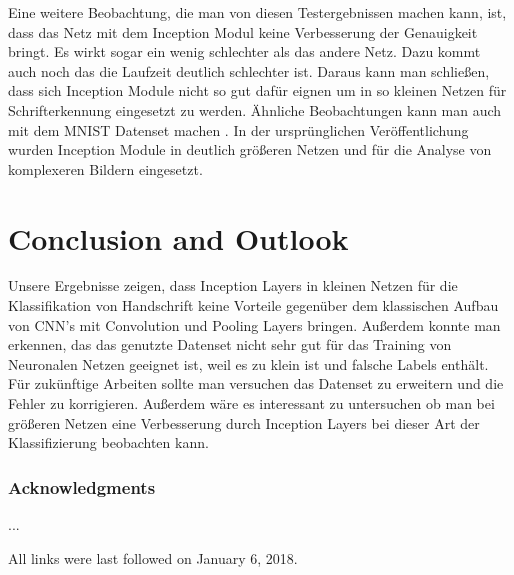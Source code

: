 \documentclass[runningheads,a4paper]{llncs}[2015/06/24]
\begin{document}
Eine weitere Beobachtung, die man von diesen Testergebnissen machen kann, ist, dass das Netz mit dem Inception Modul keine Verbesserung der Genauigkeit bringt. Es wirkt sogar ein wenig schlechter als das andere Netz. Dazu kommt auch noch das die Laufzeit deutlich schlechter ist. Daraus kann man schließen, dass sich Inception Module nicht so gut dafür eignen um in so kleinen Netzen für Schrifterkennung eingesetzt zu werden. Ähnliche Beobachtungen kann man auch mit dem MNIST Datenset machen \cite{inception_blog}. In der ursprünglichen Veröffentlichung wurden Inception Module in deutlich größeren Netzen und für die Analyse von komplexeren Bildern eingesetzt\cite{inception_paper}.

\section{Conclusion and Outlook}
Unsere Ergebnisse zeigen, dass Inception Layers in kleinen Netzen für die Klassifikation von Handschrift keine Vorteile gegenüber dem klassischen Aufbau von CNN's mit Convolution und Pooling Layers bringen. Außerdem konnte man erkennen, das das genutzte Datenset nicht sehr gut für das Training von Neuronalen Netzen geeignet ist, weil es zu klein ist und falsche Labels enthält.\\
Für zukünftige Arbeiten sollte man versuchen das Datenset zu erweitern und die Fehler zu korrigieren. Außerdem wäre es interessant zu untersuchen ob man bei größeren Netzen eine Verbesserung durch Inception Layers bei dieser Art der Klassifizierung beobachten kann.
\subsubsection*{Acknowledgments}
...





All links were last followed on January 6, 2018.
\end{document}
